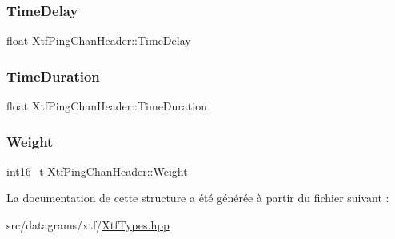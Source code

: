 \subsubsection{\texorpdfstring{Time\+Delay}{TimeDelay}}
{\footnotesize\ttfamily float Xtf\+Ping\+Chan\+Header\+::\+Time\+Delay}

\mbox{\label{structXtfPingChanHeader_ac74621607feab6bb035f0593941168d5}} 
\subsubsection{\texorpdfstring{Time\+Duration}{TimeDuration}}
{\footnotesize\ttfamily float Xtf\+Ping\+Chan\+Header\+::\+Time\+Duration}

\mbox{\label{structXtfPingChanHeader_a7f1b535bf81c110abea3862c6cf71e6b}} 
\subsubsection{\texorpdfstring{Weight}{Weight}}
{\footnotesize\ttfamily int16\+\_\+t Xtf\+Ping\+Chan\+Header\+::\+Weight}



La documentation de cette structure a été générée à partir du fichier suivant \+:\begin{DoxyCompactItemize}
\item 
src/datagrams/xtf/\hyperlink{XtfTypes_8hpp}{Xtf\+Types.\+hpp}\end{DoxyCompactItemize}
